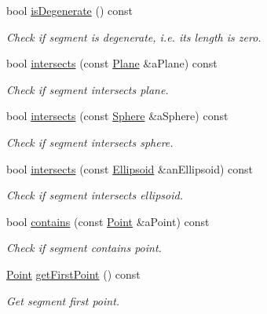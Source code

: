 \begin{DoxyCompactItemize}
bool \hyperlink{classostk_1_1math_1_1geom_1_1d3_1_1objects_1_1_segment_a472767f407b4fa42ae6de7d48ccb60d0}{is\+Degenerate} () const
\begin{DoxyCompactList}\small\item\em Check if segment is degenerate, i.\+e. its length is zero. \end{DoxyCompactList}\item 
bool \hyperlink{classostk_1_1math_1_1geom_1_1d3_1_1objects_1_1_segment_a0d26133252b257cf0d9553ac418200c5}{intersects} (const \hyperlink{classostk_1_1math_1_1geom_1_1d3_1_1objects_1_1_plane}{Plane} \&a\+Plane) const
\begin{DoxyCompactList}\small\item\em Check if segment intersects plane. \end{DoxyCompactList}\item 
bool \hyperlink{classostk_1_1math_1_1geom_1_1d3_1_1objects_1_1_segment_a89ca3e575e43516435d8b3f6f5a6c624}{intersects} (const \hyperlink{classostk_1_1math_1_1geom_1_1d3_1_1objects_1_1_sphere}{Sphere} \&a\+Sphere) const
\begin{DoxyCompactList}\small\item\em Check if segment intersects sphere. \end{DoxyCompactList}\item 
bool \hyperlink{classostk_1_1math_1_1geom_1_1d3_1_1objects_1_1_segment_a281320eb45dcfce43caab69fb4051242}{intersects} (const \hyperlink{classostk_1_1math_1_1geom_1_1d3_1_1objects_1_1_ellipsoid}{Ellipsoid} \&an\+Ellipsoid) const
\begin{DoxyCompactList}\small\item\em Check if segment intersects ellipsoid. \end{DoxyCompactList}\item 
bool \hyperlink{classostk_1_1math_1_1geom_1_1d3_1_1objects_1_1_segment_a07d2c8bc8f734b3a99fb4f11610f9fab}{contains} (const \hyperlink{classostk_1_1math_1_1geom_1_1d3_1_1objects_1_1_point}{Point} \&a\+Point) const
\begin{DoxyCompactList}\small\item\em Check if segment contains point. \end{DoxyCompactList}\item 
\hyperlink{classostk_1_1math_1_1geom_1_1d3_1_1objects_1_1_point}{Point} \hyperlink{classostk_1_1math_1_1geom_1_1d3_1_1objects_1_1_segment_a0dd0944d8a53bc07b241fc933a2b023f}{get\+First\+Point} () const
\begin{DoxyCompactList}\small\item\em Get segment first point. \end{DoxyCompactList}\item 

\end{DoxyCompactItemize}
